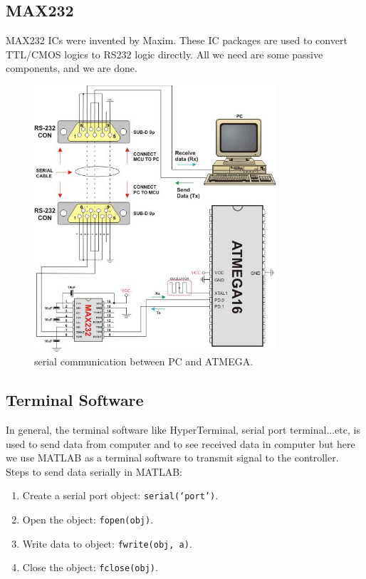 \documentclass[12pt, a4paper, twoside]{report}
\begin{document}
\subsection{MAX232}
MAX232 ICs were invented by Maxim. These IC packages are used to convert TTL/CMOS logics to RS232 logic directly. All we need are some passive components, and we are done.
\begin{figure}[!h]
	\centering
	\includegraphics[width=0.8\textwidth]
	{images/chapter6/hardware-1}
	\caption{serial communication between PC and ATMEGA.}
	\label{fig:hardware-1}
\end{figure}

\subsection{Terminal Software}
In general, the terminal software like HyperTerminal, serial port terminal...etc, is used to send data from computer and to see received data in computer but here we use MATLAB  as a terminal software  to transmit signal  to the controller.
Steps to send data serially in MATLAB:
\begin{enumerate}[noitemsep]
\item Create a serial port object: \texttt{serial(`port')}.
\item Open the object: \texttt{fopen(obj)}.
\item Write data to object: \texttt{fwrite(obj, a)}.
\item Close the object: \texttt{fclose(obj)}.
\end{enumerate}
\end{document}
